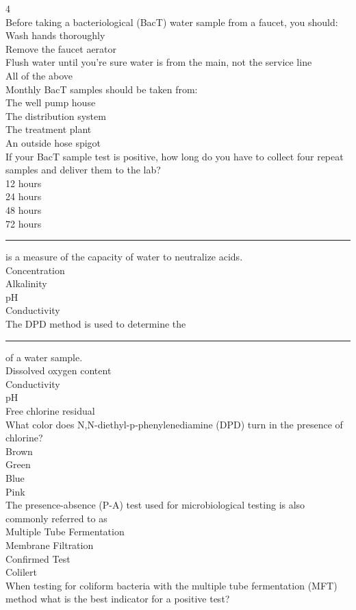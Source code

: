 4\\
Before taking a bacteriological (BacT) water sample from a faucet, you should:\\
Wash hands thoroughly\\
Remove the faucet aerator\\
Flush water until you’re sure water is from the main, not the service line\\
All of the above\\
Monthly BacT samples should be taken from:\\
The well pump house\\
The distribution system\\
The treatment plant\\
An outside hose spigot\\
If your BacT sample test is positive, how long do you have to collect four repeat samples and deliver them to the lab?\\
12 hours\\
24 hours\\
48 hours\\
72 hours\\
\rule{2cm}{0.3pt}is a measure of the capacity of water to neutralize acids.\\
Concentration\\
Alkalinity\\
pH\\
Conductivity\\
The DPD method is used to determine the \rule{2cm}{0.3pt} of a water sample.\\
Dissolved oxygen content\\
Conductivity\\
pH\\
Free chlorine residual\\
What color does N,N-diethyl-p-phenylenediamine (DPD) turn in the presence of\\
chlorine?\\
Brown\\
Green\\
Blue\\
Pink\\
 The presence-absence (P-A) test used for microbiological testing is also commonly referred to as\\
Multiple Tube Fermentation\\
Membrane Filtration\\
Confirmed Test\\
Colilert\\
 When testing for coliform bacteria with the multiple tube fermentation (MFT) method what is the best indicator for a positive test?\\
